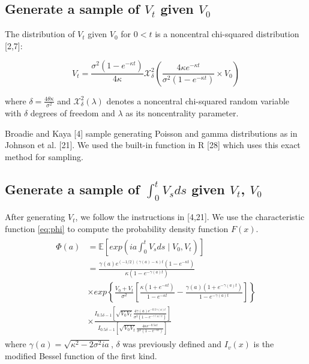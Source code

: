 \documentclass[12pt,twoside]{reedthesis}
\theoremstyle{definition}
\theoremstyle{definition}
\theoremstyle{remark}
\begin{document}
  \subsection{\texorpdfstring{Generate a sample of \(V_t\) given
  \(V_0\)}{Generate a sample of V\_t given V\_0}}\label{generate-a-sample-of-v_t-given-v_0}
  
  The distribution of \(V_t\) given \(V_0\) for \(0 < t\) is a noncentral
  chi-squared distribution {[}2,7{]}:
  
  \[V_t = \frac{\sigma^2 (1-e^{- \kappa t})}{4 \kappa} \mathcal{X}_{\delta}^{2} \left( \frac{4 \kappa e^{- \kappa t}}{\sigma^2 (1- e^{- \kappa t})} \times V_0\right)\]
  
  where \(\delta = \frac{4 \theta \kappa}{\sigma^2}\) and
  \(\mathcal{X}_{\delta}^{2}(\lambda)\) denotes a noncentral chi-squared
  random variable with \(\delta\) degrees of freedom and \(\lambda\) as
  its noncentrality parameter.
  
  Broadie and Kaya {[}4{]} sample generating Poisson and gamma
  distributions as in Johnson et al. {[}21{]}. We used the built-in
  function in R {[}28{]} which uses this exact method for sampling.
  
  \subsection{\texorpdfstring{Generate a sample of \(\int_0^t V_sds\)
  given \(V_t\),
  \(V_0\)}{Generate a sample of \textbackslash{}int\_0\^{}t V\_sds given V\_t, V\_0}}\label{generate-a-sample-of-int_0t-v_sds-given-v_t-v_0}
  
  After generating \(V_t\), we follow the instructions in {[}4,21{]}. We
  use the characteristic function \eqref{eq:phi} to compute the probability
  density function \(F(x)\).
  \begin{align} \label{eq:phi}
  \begin{split}
  \Phi(a) &= \mathbb{E}\left[ exp \left( ia \int_{0}^{t}{V_s ds} \mid V_0,V_t \right)  \right] \\[10pt]
  &= \frac{\gamma(a)e^{(-1/2)(\gamma(a)- \kappa) t} (1 - e^{- \kappa t})}{\kappa (1 - e^{- \gamma(a) t})} \\[10pt]
  &\times exp \left\{\frac{V_0 + V_t}{\sigma^2} \left[ \frac{\kappa (1 + e^{- \kappa t})}{1 - e^{- \kappa t}} - \frac{\gamma(a) (1 + e^{- \gamma(a) t})}{1 - e^{- \gamma(a) t}} \right] \right\} \\[10pt]
  &\times \frac{I_{0.5\delta - 1} \left[ \sqrt{V_0 V_t} \frac{4 \gamma(a) e^{-0.5 \gamma(a) t}}{\sigma^2 (1 - e^{- \gamma(a) t})} \right]}{I_{0.5\delta - 1}  \left[ \sqrt{V_0 V_t} \frac{4 \kappa e^{-0.5 \kappa t}}{\sigma^2 (1 - e^{- \kappa t})} \right]}
  \end{split}
  \end{align}
  where \(\gamma(a) = \sqrt{\kappa^2 - 2 \sigma^2 i a}\), \(\delta\) was
  previously defined and \(I_v(x)\) is the modified Bessel function of the
  first kind.
  
\end{document}
